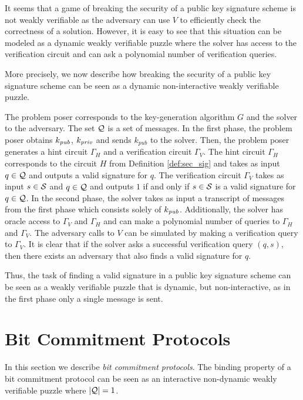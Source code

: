 %
It seems that a game of breaking the security of a public key signature scheme is not weakly verifiable as the adversary can use $V$
to efficiently check the correctness of a solution. However, it is easy to see that this situation can be modeled as
a dynamic weakly verifiable puzzle where the solver has access to the verification circuit and can ask a polynomial number of verification queries.

More precisely, we now describe how breaking the security of a public key signature scheme can be
seen as a dynamic non-interactive weakly verifiable puzzle.

The problem poser corresponds to the key-generation algorithm $G$ and the solver to the adversary. The set $\mathcal{Q}$ is a set of messages.
In the first phase, the problem poser obtains $k_{\operatorname{\mathit{pub}}}$, $k_{\operatorname{\mathit{priv}}}$ and sends $k_{pub}$ to the solver.
Then, the problem poser generates a hint circuit $\Gamma_H$ and a verification circuit $\Gamma_V$.
The hint circuit $\Gamma_H$ corresponds to the circuit $H$ from Definition \ref{def:sec_sig} and takes as input $q \in \mathcal{Q}$ and outputs a valid signature for $q$.
The verification circuit $\Gamma_V$ takes as input $s \in \mathcal{S}$ and $q \in \mathcal{Q}$ and outputs $1$ if and only if $s \in \mathcal{S}$ is a valid signature for $q \in \mathcal{Q}$.
In the second phase, the solver takes as input a transcript of messages from the first phase which consists solely of $k_{\operatorname{\mathit{pub}}}$.
Additionally, the solver has oracle access to $\Gamma_V$ and $\Gamma_H$ and can make a polynomial number of queries to $\Gamma_H$ and $\Gamma_V$.
The adversary calls to $V$ can be simulated by making a verification query to $\Gamma_V$.
It is clear that if the solver asks a successful verification query $(q,s)$,
then there exists an adversary that also finds a valid signature for $q$.

Thus, the task of finding a valid signature in a public key signature scheme can be seen as a weakly verifiable puzzle that
is dynamic, but non-interactive, as in the first phase only a single message is sent.

\section{Bit Commitment Protocols}
\label{section:bc}
In this section we describe \textit{bit commitment protocols}. The binding property of
a bit commitment protocol can be seen as an interactive non-dynamic weakly verifiable puzzle where $|\mathcal{Q}| = 1$.

